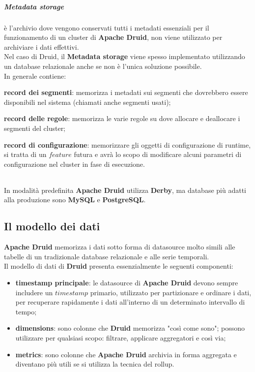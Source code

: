 \subparagraph{Metadata storage} è l’archivio dove vengono conservati tutti i \gls{metadati}{} essenziali
per il funzionamento di un \gls{cluster}{} di \textbf{Apache Druid}, non viene utilizzato per archiviare i dati effettivi.\\
Nel caso di Druid, il \textbf{Metadata storage} viene spesso implementato utilizzando un database relazionale anche se non è l'unica soluzione possibile.\\ 
In generale contiene:
\begin{list}{*}
    \item \textbf{record dei segmenti}: memorizza i \gls{metadati}{} sui segmenti che dovrebbero
    essere disponibili nel sistema (chiamati anche segmenti usati);
    \item \item \textbf{record delle regole}: memorizza le varie regole su dove allocare e deallocare i segmenti del cluster;
    \item \textbf{record di configurazione}: memorizzare gli oggetti di configurazione
    di runtime, si tratta di un $feature$ futura e avrà lo scopo di modificare alcuni parametri di configurazione nel \gls{cluster}{} in
    fase di esecuzione.
\end{list}
\noindent
\\
In modalità predefinita \textbf{Apache Druid} utilizza \textbf{Derby}, ma database più adatti alla produzione
sono \textbf{MySQL} e \textbf{PostgreSQL}.
\pagebreak
\subsection{Il modello dei dati}
\textbf{Apache Druid} memorizza i dati sotto forma di \gls{datasource}{} molto simili alle tabelle di un tradizionale database relazionale e alle serie temporali.
\\Il modello di dati di \textbf{Druid} presenta essenzialmente le seguenti componenti:
\begin{itemize}
    \item \textbf{timestamp principale}:  le \gls{datasource}{} di \textbf{Apache Druid}  devono sempre includere un $timestamp$ primario,  utilizzato per partizionare e ordinare i dati, per recuperare rapidamente i dati all'interno di un determinato intervallo di tempo;
    \item \textbf{dimensions}: sono colonne che \textbf{Druid} memorizza "così come sono"; possono utilizzare per qualsiasi scopo: filtrare, applicare aggregatori e così via;
    \item \textbf{metrics}: sono colonne che \textbf{Apache Druid} archivia in forma aggregata e diventano più utili se si utilizza la tecnica del rollup.
\end{itemize}
\pagebreak
